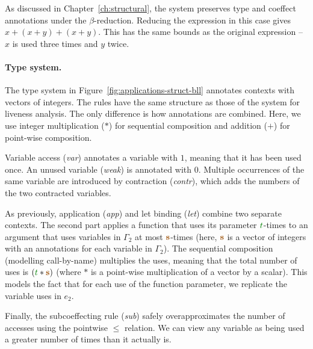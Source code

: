As discussed in Chapter~\ref{ch:structural}, the system preserves type and coeffect annotations under
the $\beta$-reduction. Reducing the expression in this case gives $x + (x+y) + (x+y)$. This has the
same bounds as the original expression -- $x$ is used three times and $y$ twice.


\paragraph{Type system.}
The type system in Figure~\ref{fig:applications-struct-bll} annotates contexts with vectors of integers.
The rules have the same structure as those of the system for liveness analysis. The only difference is
how annotations are combined. Here, we use integer multiplication ($\ast$) for sequential composition
and addition ($+$) for point-wise composition.

Variable access (\emph{var}) annotates a variable with $1$, meaning that it has been used once. An
unused variable (\emph{weak}) is annotated with $0$. Multiple occurrences of the same variable are
introduced by contraction (\emph{contr}), which adds the numbers of the two contracted variables.

As previously, application (\emph{app}) and let binding (\emph{let}) combine two separate contexts.
The second part applies a function that uses its parameter $\cclrd{t}$-times to an argument that uses
variables in $\Gamma_2$ at most $\aclrd{\mathbf{s}}$-times (here, $\aclrd{\mathbf{s}}$ is a vector of
integers with an annotations for each variable in $\Gamma_2$). The sequential composition (modelling
call-by-name) multiplies the uses, meaning that the total number of uses is $(\cclrd{t} \ast \aclrd{\mathbf{s}})$
(where $\ast$ is a point-wise multiplication of a vector by a scalar). This models the fact that
for each use of the function parameter, we replicate the variable uses in $e_2$.

Finally, the subcoeffecting rule (\emph{sub}) safely overapproximates the number of accesses using
the pointwise $\leq$ relation. We can view any variable as being used a greater
number of times than it actually is.

